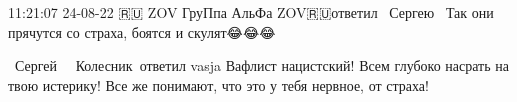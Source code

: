  
 
 
 
 

11:21:07 24-08-22
🇷🇺 ZOV ГруПпа АльФа ZOV🇷🇺ответил ~Сергею~
Так они прячутся со страха, боятся и скулят😂😂😂

~Сергей~ ~Колесник~ответил vasja
Вафлист нацистский! Всем глубоко насрать на твою истерику! Все же понимают, что это у тебя нервное, от страха!
